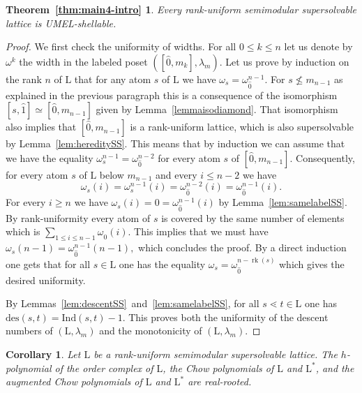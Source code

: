 \documentclass[11pt,a4paper]{amsart}
\theoremstyle{results}
\newtheorem{corollary}[thm]{Corollary}
\theoremstyle{definitions}
\newcommand{\rk}{\operatorname{rk}}
\newcommand{\zero}{\hat{0}}
\newcommand{\des}{\mathrm{des}}
\newcommand{\un}{\hat{1}}
\newcommand{\Latt}{\mathrm{L}}
\newcommand{\Ind}{\mathrm{Ind}}
\renewcommand{\hat}{\widehat}
\begin{document}
\newtheorem*{thm:intro4}{Theorem~\ref{thm:main4-intro}}
\begin{thm:intro4}
{\itshape Every rank-uniform semimodular supersolvable lattice is UMEL-shellable.}
\end{thm:intro4}
\begin{proof}

We first check the uniformity of widths. For all $0 \leqslant k \leqslant n$ let us denote by $\omega^{k}$ the width in the labeled poset $([\zero, m_{k}], \lambda_m)$. Let us prove by induction on the rank $n$ of $\Latt$ that for any atom $s$ of $\Latt$ we have $\omega_s= \omega^{n-1}_{\zero}$. For $s \not\leqslant m_{n-1}$ as explained in the previous paragraph this is a consequence of the isomorphism $[s, \un] \simeq [\zero, m_{n-1}]$ given by Lemma~\ref{lemmaisodiamond}. That isomorphism also implies that $[\zero, m_{n-1}]$ is a rank-uniform lattice, which is also supersolvable by Lemma~\ref{lem:hereditySS}. This means that by induction we can assume that we have the equality $\omega^{n-1}_s = \omega^{n-2}_{\zero}$ for every atom $s$ of $[\zero, m_{n-1}].$ Consequently, for every atom $s$ of $\Latt$ below $m_{n-1}$ and every $i \leqslant n-2$ we have 
\begin{equation*}
    \omega_{s}(i) = \omega^{n-1}_s(i) = \omega^{n-2}_{\zero}(i) = \omega^{n-1}_{\zero}(i).
\end{equation*}
For every $i \geqslant n$ we have $\omega_s(i) = 0 = \omega^{n-1}_{\zero}(i)$ by Lemma~\ref{lem:samelabelSS}. By rank-uniformity every atom of $s$ is covered by the same number of elements which is $\sum_{1 \leqslant i \leqslant n-1} \omega_{\zero}(i).$ This implies that we must have $\omega_{s}(n-1) = \omega^{n-1}_{\zero}(n-1),$ which concludes the proof. By a direct induction one gets that for all $s \in \Latt$ one has the equality $\omega_{s} = \omega^{n-\rk(s)}_{\zero}$ which gives the desired uniformity. 

By Lemmas~\ref{lem:descentSS}~and~\ref{lem:samelabelSS}, for all $s \lessdot t \in \Latt$ one has $\des(s,t) = \Ind(s,t) - 1$. This proves both the uniformity of the descent numbers of $(\Latt, \lambda_m)$ and the monotonicity of $(\Latt, \lambda_m).$
\end{proof}

\begin{corollary}
Let $\Latt$ be a rank-uniform semimodular supersolvable lattice. The $h$-polynomial of the order complex of  $\Latt$, the Chow polynomials of $\Latt$ and $\Latt^{\ast}$, and the augmented Chow polynomials of $\Latt$ and $\Latt^{\ast}$ are real-rooted.
\end{corollary}
\end{document}
